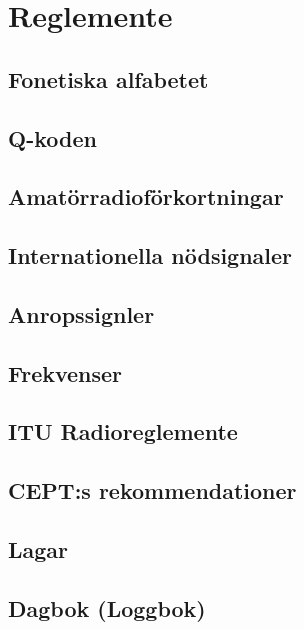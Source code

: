 \documentclass[10pt,openright]{report}
\begin{document}
\setcounter{part}{17}
\setcounter{chapter}{0}
\part{Reglemente}

\chapter{Fonetiska alfabetet}


\chapter{Q-koden}


\chapter{Amatörradioförkortningar}


\chapter{Internationella nödsignaler}


\chapter{Anropssignler}


\chapter{Frekvenser}


\chapter{ITU Radioreglemente}


\chapter{CEPT:s rekommendationer}


\chapter{Lagar}


\chapter{Dagbok (Loggbok)}

\end{document}
